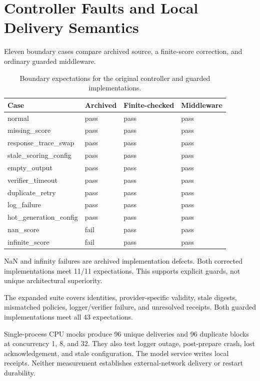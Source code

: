 \documentclass[journal,onecolumn]{IEEEtran}
\begin{document}
\section{Controller Faults and Local Delivery Semantics}
\label{sec:s8}
Eleven boundary cases compare archived source, a finite-score correction, and ordinary guarded middleware.
\begin{table}[H]
\centering
\caption{Boundary expectations for the original controller and guarded implementations.}\label{tab:fault-detail}
\footnotesize
\setlength{\tabcolsep}{4pt}
\begin{tabular}{@{}llll@{}}
\toprule
Case & Archived & Finite-checked & Middleware\\
\midrule
normal & pass & pass & pass\\
missing\_score & pass & pass & pass\\
response\_trace\_swap & pass & pass & pass\\
stale\_scoring\_config & pass & pass & pass\\
empty\_output & pass & pass & pass\\
verifier\_timeout & pass & pass & pass\\
duplicate\_retry & pass & pass & pass\\
log\_failure & pass & pass & pass\\
hot\_generation\_config & pass & pass & pass\\
nan\_score & fail & pass & pass\\
infinite\_score & fail & pass & pass\\
\bottomrule
\end{tabular}
\end{table}

NaN and infinity failures are archived implementation defects. Both corrected implementations meet 11/11 expectations. This supports explicit guards, not unique architectural superiority.


The expanded suite covers identities, provider-specific validity, stale digests, mismatched policies, logger/verifier failure, and unresolved receipts. Both guarded implementations meet all 43 expectations.

Single-process CPU mocks produce 96 unique deliveries and 96 duplicate blocks at concurrency 1, 8, and 32. They also test logger outage, post-prepare crash, lost acknowledgement, and stale configuration. The model service writes local receipts. Neither measurement establishes external-network delivery or restart durability.
\end{document}
